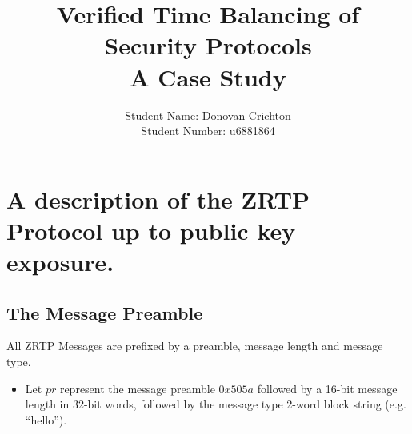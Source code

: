 \documentclass[11pt]{article}
\title{Verified Time Balancing of Security Protocols 
  \\ \large A Case Study}
\author{Student Name: Donovan Crichton\\
Student Number: u6881864}
\date{}
\begin{document}
\maketitle
  \section{A description of the ZRTP Protocol up to public key 
           exposure.}
  \subsection{The Message Preamble}
  All ZRTP Messages are prefixed by a preamble, message length
  and message type. 
  \begin{itemize}
  \item Let $pr$ represent the message preamble $0x505a$ followed
        by a 16-bit message length in 32-bit words, followed by the 
        message type 2-word block string (e.g. ``hello'').
  \end{itemize}
\end{document}
